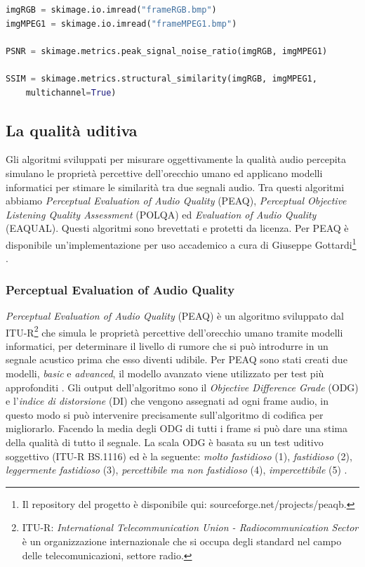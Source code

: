 \begin{lstlisting}[language=Python, caption=Script Python per il calcolo di PSNR e SSIM, label={lst:PyPSNR_SSIM}]
imgRGB = skimage.io.imread("frameRGB.bmp")
imgMPEG1 = skimage.io.imread("frameMPEG1.bmp")

PSNR = skimage.metrics.peak_signal_noise_ratio(imgRGB, imgMPEG1)

SSIM = skimage.metrics.structural_similarity(imgRGB, imgMPEG1,
	multichannel=True)
\end{lstlisting}



\subsection{La qualità uditiva}
Gli algoritmi sviluppati per misurare oggettivamente la qualità audio percepita simulano le proprietà percettive dell'orecchio umano ed applicano modelli informatici per stimare le similarità tra due segnali audio. Tra questi algoritmi abbiamo \textit{Perceptual Evaluation of Audio Quality} (PEAQ), \textit{Perceptual Objective Listening Quality Assessment} (POLQA) ed \textit{Evaluation of Audio Quality} (EAQUAL). Questi algoritmi sono brevettati e protetti da licenza. Per PEAQ è disponibile un'implementazione per uso accademico a cura di Giuseppe Gottardi\footnote{Il repository del progetto è disponibile qui: sourceforge.net/projects/peaqb.} \parencite{PoctaPeter2015SaOA}.



\subsubsection{Perceptual Evaluation of Audio Quality}
\textit{Perceptual Evaluation of Audio Quality} (PEAQ) è un algoritmo sviluppato dal ITU-R\footnote{ITU-R: \textit{International Telecommunication Union - Radiocommunication Sector} è un organizzazione internazionale che si occupa degli standard nel campo delle telecomunicazioni, settore radio.} che simula le proprietà percettive dell'orecchio umano tramite modelli informatici, per determinare il livello di rumore che si può introdurre in un segnale acustico prima che esso diventi udibile. Per PEAQ sono stati creati due modelli, \textit{basic} e \textit{advanced}, il modello avanzato viene utilizzato per test più approfonditi \parencite{UlovecK2018PAQA}. Gli output dell'algoritmo sono il \textit{Objective Difference Grade} (ODG) e l'\textit{indice di distorsione} (DI) che vengono assegnati ad ogni frame audio, in questo modo si può intervenire precisamente sull'algoritmo di codifica per migliorarlo. Facendo la media degli ODG di tutti i frame si può dare una stima della qualità di tutto il segnale. La scala ODG è basata su un test uditivo soggettivo (ITU-R BS.1116) ed è la seguente: \textit{molto fastidioso} (1), \textit{fastidioso} (2), \textit{leggermente fastidioso} (3), \textit{percettibile ma non fastidioso} (4), \textit{impercettibile} (5) \parencite{PoctaPeter2015SaOA}.

